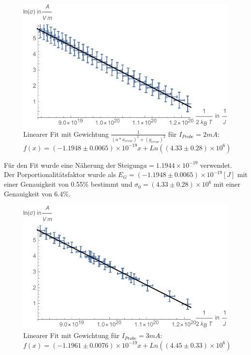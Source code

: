 \begin{figure}[H]
	\centering
	\includegraphics[width=0.9\linewidth]{IMAGE/M1_2mA.pdf}
	\caption{Linearer Fit mit Gewichtung $\frac{1}{(a*x_{error})^2+(y_{error})^2}$ für $I_{Probe}=2mA$:\\ $f(x)=(-1.1948 \pm 0.0065)\times 10^{-19}x + Ln((4.33 \pm 0.28)\times 10^{6})$}
	\label{fig:M1_1}
\end{figure} 

Für den Fit wurde eine Näherung der Steigung$a=1.1944\times 10^{-19}$ verwendet.\\
Der Porportionalitätsfaktor wurde als $E_{G}=(-1.1948 \pm 0.0065)\times 10^{-19} [J]$ mit einer Genauigkeit von 0.55\% bestimmt und $\sigma_{0}=(4.33 \pm 0.28)\times 10^{6}$ mit einer Genauigkeit von 6.4\%.\\

\begin{figure}[H]
	\centering
\includegraphics[width=0.9\linewidth]{IMAGE/M1_3mA.pdf}
	\caption{Linearer Fit mit Gewichtung für $I_{Probe}=3mA$:\\ $f(x)=(-1.1961 \pm 0.0076)\times 10^{-19}x + Ln((4.45 \pm 0.33)\times 10^{6})$}
	\label{fig:M1_2}
\end{figure} 


